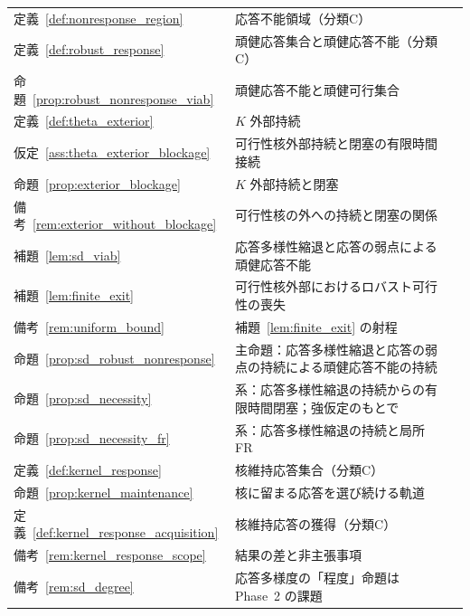 \begin{longtable}{p{2.4cm} p{10.4cm} r}
定義~\ref{def:nonresponse_region} & 応答不能領域（分類C） & \pageref{def:nonresponse_region} \\
定義~\ref{def:robust_response} & 頑健応答集合と頑健応答不能（分類C） & \pageref{def:robust_response} \\
命題~\ref{prop:robust_nonresponse_viab} & 頑健応答不能と頑健可行集合 & \pageref{prop:robust_nonresponse_viab} \\
定義~\ref{def:theta_exterior} & $K$ 外部持続 & \pageref{def:theta_exterior} \\
仮定~\ref{ass:theta_exterior_blockage} & 可行性核外部持続と閉塞の有限時間接続 & \pageref{ass:theta_exterior_blockage} \\
命題~\ref{prop:exterior_blockage} & $K$ 外部持続と閉塞 & \pageref{prop:exterior_blockage} \\
備考~\ref{rem:exterior_without_blockage} & 可行性核の外への持続と閉塞の関係 & \pageref{rem:exterior_without_blockage} \\
補題~\ref{lem:sd_viab} & 応答多様性縮退と応答の弱点による頑健応答不能 & \pageref{lem:sd_viab} \\
補題~\ref{lem:finite_exit} & 可行性核外部におけるロバスト可行性の喪失 & \pageref{lem:finite_exit} \\
備考~\ref{rem:uniform_bound} & 補題~\ref{lem:finite_exit} の射程 & \pageref{rem:uniform_bound} \\
命題~\ref{prop:sd_robust_nonresponse} & 主命題：応答多様性縮退と応答の弱点の持続による頑健応答不能の持続 & \pageref{prop:sd_robust_nonresponse} \\
命題~\ref{prop:sd_necessity} & 系：応答多様性縮退の持続からの有限時間閉塞；強仮定のもとで & \pageref{prop:sd_necessity} \\
命題~\ref{prop:sd_necessity_fr} & 系：応答多様性縮退の持続と局所 FR & \pageref{prop:sd_necessity_fr} \\
定義~\ref{def:kernel_response} & 核維持応答集合（分類C） & \pageref{def:kernel_response} \\
命題~\ref{prop:kernel_maintenance} & 核に留まる応答を選び続ける軌道 & \pageref{prop:kernel_maintenance} \\
定義~\ref{def:kernel_response_acquisition} & 核維持応答の獲得（分類C） & \pageref{def:kernel_response_acquisition} \\
備考~\ref{rem:kernel_response_scope} & 結果の差と非主張事項 & \pageref{rem:kernel_response_scope} \\
備考~\ref{rem:sd_degree} & 応答多様度の「程度」命題は Phase~2 の課題 & \pageref{rem:sd_degree} \\

\end{longtable}

